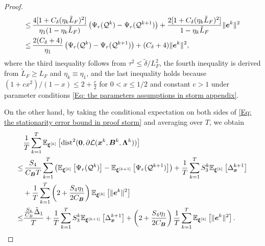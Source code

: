 \begin{proof}
\begin{align}
\leq &\,\frac{4 [ 1 + C_{\delta}(\eta_{k}\tilde{L}_{F})^{2}]}{\eta_{1}(1 - \eta_{k}\tilde{L}_{F})}\left( \Psi_r(\mathcal{Q}^{k}) - \Psi_r(\mathcal{Q}^{k+1})\right) + \frac{2 [ 1 +C_{\delta}(\eta_{k}\tilde{L}_{F})^{2}]}{1 - \eta_{k}\tilde{L}_{F}}\| \bm{e}^{k}\|^{2}\notag                                                                     \\
\leq &\, \frac{2(C_{\delta}+ 4)}{\eta_{1}}\left( \Psi_r(\mathcal{Q}^{k}) - \Psi_r(\mathcal{Q}^{k+1})\right) + (C_{\delta}+ 4) \| \bm{e}^{k}\|^{2},
\end{align} where the third inequality follows from $\tau^{2}\leq \tilde{\delta}/ L_{F}^{2}$,
    the fourth inequality is derived from $\tilde{L}_{F}\geq L_{F}$ and
    $\eta_{k}\equiv \eta_{1}$, and the last inequality holds because $(1 + cx^{2}
    ) / (1 - x) \leq 2 + \frac{c}{2}$ for $0 < x \leq 1/2$ and constant $c >1$ under
    parameter conditions \eqref{Eq: the parameters assumptions in storm appendix}.

    On the other hand, by taking the conditional expectation on both sides of \eqref{Eq: the stationarity error bound in proof storm}
    and averaging over $T$, we obtain
    \begin{align}
             & \frac{1}{T}\sum\limits_{ k =1}^{T} \mathbb{E}_{\bm{\xi}^{[k]}}\left[\text{dist}^{2}(\bm{0}, \partial \mathcal{L}(\bm{x}^{k}, \bm{B}^{k}, \bm{\Lambda}^{k}))\right] \notag                                                                                                                                                                      \\
        \leq & \,\frac{S_{4}}{C_{\bm{B}}T}\sum\limits_{ k =1}^{T} \left( \mathbb{E}_{\bm{\xi}^{[k]}}\left[\Psi_r(\mathcal{Q}^{k})\right] - \mathbb{E}_{\bm{\xi}^{[k+1]}}\left[\Psi_r(\mathcal{Q}^{k+1}) \right] \right)+ \frac{1}{T}\sum\limits_{ k =1}^{T} S_{3}^{k}\mathbb{E}_{\bm{\xi}^{[k]}}\left[ \Delta_{\bm{x}}^{k+1}\right] \notag                                                     \\
             & +\frac{1}{T}\sum\limits_{ k =1}^{T} \left( 2 + \frac{S_{4}\eta_{1}}{2C_{\bm{B}}}\right) \mathbb{E}_{\bm{\xi}^{[k]}}\left[\| \bm{e}^{k}\|^{2}\right] \notag                                                                                                                                                                                 \\
        \leq & \frac{\frac{S_4}{C_B}\tilde{\Delta}_{1}}{ T}+ \frac{1}{T}\sum\limits_{ k =1}^{T} S_{3}^{k}\mathbb{E}_{\bm{\xi}^{[k+1]}}\left[ \Delta_{\bm{x}}^{k+1}\right]+\left( 2 + \frac{S_{4}\eta_{1}}{2C_{\bm{B}}}\right)\frac{1}{T}\sum\limits_{ k =1}^{T} \mathbb{E}_{\bm{\xi}^{[k]}}\left[\| \bm{e}^{k}\|^{2}\right].\label{Eq: the averaged stationarity error bound in proof}
    \end{align}


\end{proof}
